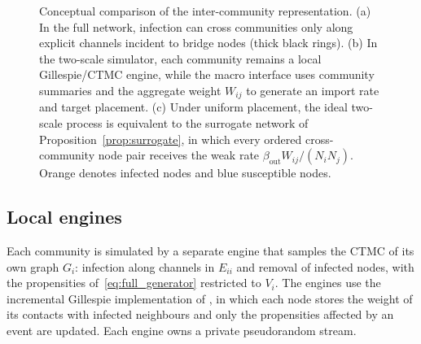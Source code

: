 \documentclass[a4paper,fleqn]{cas-sc}
\begin{document}
\begin{figure}[tbp]
\caption{Conceptual comparison of the inter-community representation. (a) In the full network, infection can cross communities only along explicit channels incident to bridge nodes (thick black rings). (b) In the two-scale simulator, each community remains a local Gillespie/CTMC engine, while the macro interface uses community summaries and the aggregate weight $W_{ij}$ to generate an import rate and target placement. (c) Under uniform placement, the ideal two-scale process is equivalent to the surrogate network of Proposition~\ref{prop:surrogate}, in which every ordered cross-community node pair receives the weak rate $\beta_{\mathrm{out}}W_{ij}/(N_iN_j)$. Orange denotes infected nodes and blue susceptible nodes.}
\label{fig:schematic}
\end{figure}

\subsection{Local engines}
\label{sec:local}

Each community is simulated by a separate engine that samples the CTMC of its own graph $G_i$: infection along channels in $E_{ii}$ and removal of infected nodes, with the propensities of~\eqref{eq:full_generator} restricted to $V_i$. The engines use the incremental Gillespie implementation of \citet{kuryliak2025simulating}, in which each node stores the weight of its contacts with infected neighbours and only the propensities affected by an event are updated. Each engine owns a private pseudorandom stream.
\end{document}
